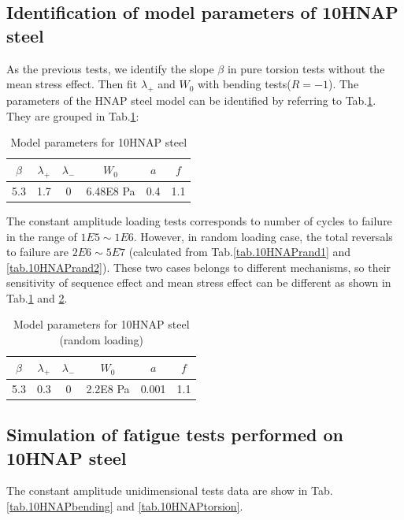 \documentclass[3p,times,procedia,number]{elsarticle}
\begin{document}
\subsection{Identification of model parameters of 10HNAP steel}
As the previous tests, we identify the slope $\beta$ in pure torsion tests without the mean stress effect. Then fit $\lambda_+$ and $W_0$ with bending tests($R=-1$). The parameters of the HNAP steel model can be identified by referring to Tab.\ref{tab.10HNAP.para}. They are grouped in Tab.\ref{tab.10HNAP.para}:
\begin{table}[!h]
	\centering
	\begin{tabular}{|c|c|c|c|c|c|}
		\hline
		\textbf{$\beta$} & \textbf{$\lambda_+$} & \textbf{$\lambda_-$} & \textbf{$W_0$} & \textbf{$a$} & \textbf{$f$} \\ \hline
		5.3    & 1.7 &0         &6.48E8 Pa  & 0.4   & 1.1 \\ \hline
	\end{tabular}
	\caption{Model parameters for 10HNAP steel}
	\label{tab.10HNAP.para}
\end{table}

The constant amplitude loading tests corresponds to number of cycles to failure in the range of $1E5\sim1E6$. However, in random loading case, the total reversals to failure are $2E6\sim5E7$ (calculated from Tab.\ref{tab.10HNAPrand1} and \ref{tab.10HNAPrand2}). These two cases belongs to different mechanisms, so their sensitivity of sequence effect and mean stress effect can be different as shown in Tab.\ref{tab.10HNAP.para} and \ref{tab.10HNAP.para.random}.

\begin{table}[!h]
	\centering
	\begin{tabular}{|c|c|c|c|c|c|}
		\hline
		\textbf{$\beta$} & \textbf{$\lambda_+$} & \textbf{$\lambda_-$} & \textbf{$W_0$} & \textbf{$a$} & \textbf{$f$} \\ \hline
		5.3    & 0.3 &0         &2.2E8 Pa  & 0.001   & 1.1 \\ \hline
	\end{tabular}
	\caption{Model parameters for 10HNAP steel (random loading)}
	\label{tab.10HNAP.para.random}
\end{table}

\newpage
\subsection{Simulation of fatigue tests performed on 10HNAP steel}
The constant amplitude unidimensional tests data are show in Tab.\ref{tab.10HNAPbending} and \ref{tab.10HNAPtorsion}.
\end{document}
